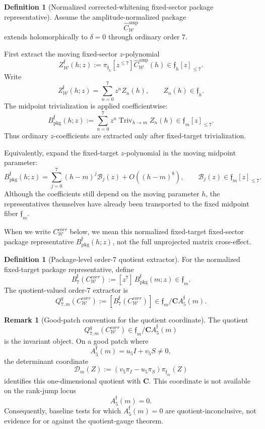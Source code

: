 \documentclass[11pt,a4paper]{amsart}
\def\corr{corr}%
\theoremstyle{plain}
\theoremstyle{definition}
\newtheorem{definition}[theorem]{Definition}
\newtheorem{remark}[theorem]{Remark}
\newcommand{\corr}{\mathrm{corr}}
\begin{document}
\begin{definition}[Normalized corrected-whitening fixed-sector package representative]
\label{def:normalized-corrected-whitening-package-representative}
Assume the amplitude-normalized package
\[
\widehat C_{\mathcal W}^{\mathrm{amp}}
\]
extends holomorphically to \(\delta=0\) through ordinary order \(7\).

First extract the moving fixed-sector \(z\)-polynomial
\[
Z_{\mathcal W}^{\mathfrak f}(h;z)
:=
\pi_{\mathfrak f_h}[z^{\le7}]
\widehat C_{\mathcal W}^{\mathrm{amp}}(h)
\in
\mathfrak f_h[z]_{\le7}.
\]
Write
\[
Z_{\mathcal W}^{\mathfrak f}(h;z)
=
\sum_{n=0}^{7}z^nZ_n(h),
\qquad
Z_n(h)\in\mathfrak f_h .
\]
The midpoint trivialization is applied coefficientwise:
\[
B_{\mathrm{pkg}}^{\mathfrak f}(h;z)
:=
\sum_{n=0}^{7}
z^n\operatorname{Triv}_{h\to m}Z_n(h)
\in
\mathfrak f_m[z]_{\le7}.
\]
Thus ordinary \(z\)-coefficients are extracted only after fixed-target
trivialization.

Equivalently, expand the fixed-target \(z\)-polynomial in the moving
midpoint parameter:
\[
B_{\mathrm{pkg}}^{\mathfrak f}(h;z)
=
\sum_{j=0}^{7}(h-m)^j\mathcal B_j(z)
+
O((h-m)^8),
\qquad
\mathcal B_j(z)\in\mathfrak f_m[z]_{\le7}.
\]
Although the coefficients still depend on the moving parameter \(h\), the
representatives themselves have already been transported to the fixed
midpoint fiber \(\mathfrak f_m\).

When we write \(C_{\mathcal W}^{\corr}\) below, we mean this normalized
fixed-target fixed-sector package representative
\(B_{\mathrm{pkg}}^{\mathfrak f}(h;z)\), not the full unprojected matrix
cross-effect.
\end{definition}

\begin{definition}[Package-level order-\(7\) quotient extractor]
\label{def:package-level-order-7-quotient-extractor}
For the normalized fixed-target package representative, define
\[
B_7^{\mathfrak f}(C_{\mathcal W}^{\corr})
:=
[z^7]\,B_{\mathrm{pkg}}^{\mathfrak f}(m;z)
\in \mathfrak f_m .
\]
The quotient-valued order-\(7\) extractor is
\[
Q_{7,m}^q(C_{\mathcal W}^{\corr})
:=
\left[
B_7^{\mathfrak f}(C_{\mathcal W}^{\corr})
\right]
\in
\mathfrak f_m/\mathbf C A_5^{\mathfrak f}(m).
\]
\end{definition}

\begin{remark}[Good-patch convention for the quotient coordinate]
\label{rem:good-patch-convention-quotient-coordinate}
The quotient
\[
Q_{7,m}^q(C_{\mathcal W}^{\corr})
\in
\mathfrak f_m/\mathbf C A_5^{\mathfrak f}(m)
\]
is the invariant object.  On a good patch where
\[
A_5^{\mathfrak f}(m)=u_5I+v_5S\ne0,
\]
the determinant coordinate
\[
\mathcal D_m(Z):=(v_5\pi_I-u_5\pi_S)\pi_{\mathfrak f_m}(Z)
\]
identifies this one-dimensional quotient with \(\mathbf C\).  This
coordinate is not available on the rank-jump locus
\[
A_5^{\mathfrak f}(m)=0.
\]
Consequently, baseline tests for which \(A_5^{\mathfrak f}(m)=0\) are
quotient-inconclusive, not evidence for or against the quotient-gauge
theorem.
\end{remark}
\end{document}
